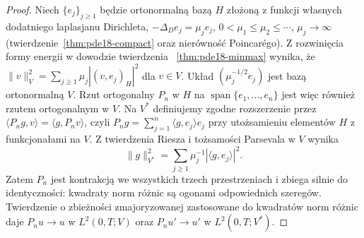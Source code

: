 \begin{proof}
Niech $\{e_j\}_{j\ge1}$ będzie ortonormalną bazą $H$ złożoną
z funkcji własnych dodatniego laplasjanu Dirichleta,
$-\Delta_D e_j=\mu_j e_j$, $0<\mu_1\le\mu_2\le\cdots$,
$\mu_j\to\infty$ (twierdzenie~\ref{thm:pde18-compact}
oraz nierówność Poincarégo).
Z rozwinięcia formy energii w dowodzie twierdzenia
~\ref{thm:pde18-minmax} wynika, że
$\|v\|_V^2=\sum_{j\ge1}\mu_j|(v,e_j)_H|^2$ dla $v\in V$.
Układ $(\mu_j^{-1/2}e_j)$ jest bazą ortonormalną $V$.
Rzut ortogonalny $P_n$ w $H$ na
$\operatorname{span}\{e_1,\ldots,e_n\}$ jest więc
również rzutem ortogonalnym w $V$.
Na $V^*$ definiujemy zgodne rozszerzenie przez
$\langle P_ng,v\rangle=\langle g,P_nv\rangle$,
czyli $P_ng=\sum_{j=1}^n\langle g,e_j\rangle e_j$
przy utożsamieniu elementów $H$ z funkcjonałami na $V$.
Z twierdzenia Riesza i tożsamości Parsevala w $V$
wynika
\[
 \|g\|_{V^*}^2=\sum_{j\ge1}\mu_j^{-1}
 |\langle g,e_j\rangle|^2.
\]
Zatem $P_n$ jest kontrakcją we wszystkich trzech
przestrzeniach i zbiega silnie do identyczności:
kwadraty norm różnic są ogonami odpowiednich szeregów.
Twierdzenie o zbieżności zmajoryzowanej zastosowane
do kwadratów norm różnic daje
$P_nu\to u$ w $L^2(0,T;V)$ oraz
$P_nu'\to u'$ w $L^2(0,T;V^*)$.


\end{proof}
